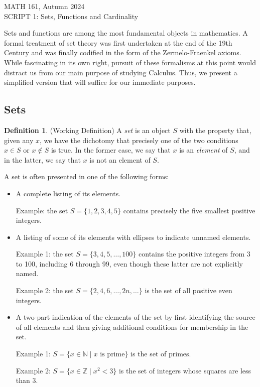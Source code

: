 \documentclass[11pt]{article}
\newcommand{\head}[1]{
	\begin{center}
		{\large #1}
		\vspace{.2 in}
	\end{center}
	
	\bigskip 
}
\theoremstyle{definition}
\newtheorem{definition}[theorem]{Definition}
\numberwithin{equation}{subsection}
\begin{document}
\pagestyle{plain}


\setcounter{section}{1}   

\head{MATH 161, Autumn 2024\\ SCRIPT 1: Sets, Functions and Cardinality } 




Sets and functions are among the most fundamental objects in mathematics.  A formal treatment
of set theory was first undertaken at the end of the 19th Century and was finally codified
in the form of the Zermelo-Fraenkel axioms.  While fascinating in its own right, pursuit of these
formalisms at this point would distract us from our main purpose of studying Calculus.  Thus, we
present a simplified version that will suffice for our immediate purposes.



\subsection*{Sets}

\begin{definition} (Working Definition)
A {\em set} is an object $S$ with the property that, given any $x$, we have the dichotomy that precisely
one of the two conditions $x\in S$ or $x\not\in S$ is true.  In the former case, we say that $x$ is an 
{\em element} of $S$, and in the latter, we say that $x$ is not an element of $S$.
\end{definition}


A set is often presented in one of the following forms:
\begin{itemize}
\item
A complete listing of its elements.

Example:  the set $S=\{1,2,3,4,5\}$ contains precisely the 
five smallest positive integers.


\item
A listing of some of its elements with ellipses to indicate unnamed elements.

Example 1:  the set $S=\{3, 4, 5, \ldots, 100\}$ contains the positive integers from 3 to 100,
including 6 through 99, even though these latter are not explicitly named.  


Example 2:  the set $S=\{2, 4, 6, \ldots, 2n, \ldots \}$ is the set of all positive even integers.


\item
A two-part indication of the elements of the set by first identifying the source of all elements
and then giving additional conditions for membership in the set.

Example 1: 
$S=\{x\in {\mathbb N}\mid \mbox{$x$ is prime}\}$ is the set of primes.  


Example 2:
$S=\{x\in {\mathbb Z}\mid \mbox{$x^2<3$}\}$ is the set of integers whose squares are less than 3.
\end{itemize}
\end{document}
